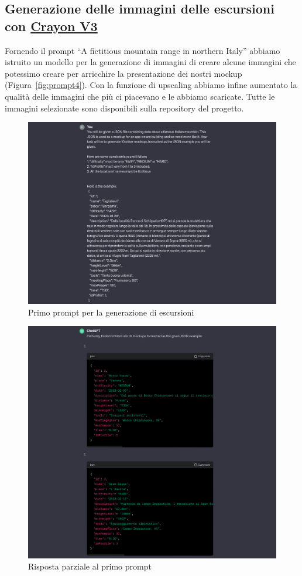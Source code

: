 \subsection{Generazione delle immagini delle escursioni con \href{https://www.craiyon.com}{Crayon V3}}
Fornendo il prompt ``A fictitious mountain range in northern Italy'' abbiamo istruito un modello per la generazione di immagini di creare alcune immagini che potessimo creare per arricchire la presentazione dei nostri mockup (Figura~\ref*{fig:prompt4}).
Con la funzione di upscaling abbiamo infine aumentato la qualità delle immagini che più ci piacevano e le abbiamo scaricate. Tutte le immagini selezionate sono disponibili sulla repository del progetto.
\newpage
\begin{figure}[ht]
  \includegraphics[width=\textwidth]{Iterazione 3/images/prompt1.png}
  \caption{Primo prompt per la generazione di escursioni}\label{fig:prompt1}
\end{figure}
\begin{figure}[ht]
  \includegraphics[width=\textwidth]{Iterazione 3/images/answer1.png}
  \caption{Risposta parziale al primo prompt}\label{fig:answ1}
\end{figure}

